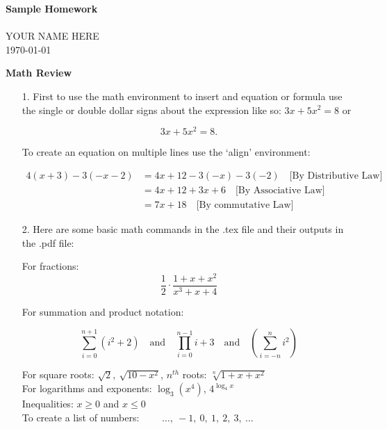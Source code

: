 \documentclass[11pt]{article}
\begin{document}
\begin{center}
{\Large \bf Sample Homework}\\
 \ \\
	{\large YOUR NAME HERE}\\{\today}
\end{center}

\vspace{0.5cm} 	%



{\large\textbf{Math Review}}

\begin{enumerate}
\item[1.] First to use the math environment to insert and equation or formula use the single or double dollar signs about the expression like so: $3x + 5x^2 = 8$ or 

$$3x+5x^2 = 8.$$

To create an equation on multiple lines use the `align' environment:

\begin{align*}
4(x+3) - 3(-x-2) & = 4x + 12 -3(-x) -3(-2) \quad \text{[By Distributive Law]}\\
&= 4x+12 + 3x + 6 \quad \text{[By Associative Law]}\\
&= 7x + 18 \quad \text{[By commutative Law]}
\end{align*}


\item[2.] Here are some basic math commands in the .tex file and their outputs in the .pdf file:

For fractions: $$\frac{1}{2} \cdot \frac{1+x + x^2}{x^3 + x + 4}$$

For summation and product notation: 

$$\sum_{i = 0}^{n+1} (i^2 + 2) \quad \text{and} \quad \prod_{i=0}^{n-1} i + 3 \quad \text{and} \quad \left(\sum_{i=-n}^n i^2 \right)$$

For square roots: $\sqrt{2}, ~ \sqrt{10 - x^2}$, $n^{th}$ roots: $\sqrt[n]{1+x+x^2}$\\

For logarithms and exponents: $\log_3 (x^4)$, $4^{\log_4 x}$\\

Inequalities: $x\geq 0$ and $x \leq 0$\\

To create a list of numbers: $\qquad \dots, ~ -1, ~ 0, ~ 1, ~2, ~ 3, ~ \dots$


\end{enumerate}
\end{document}
